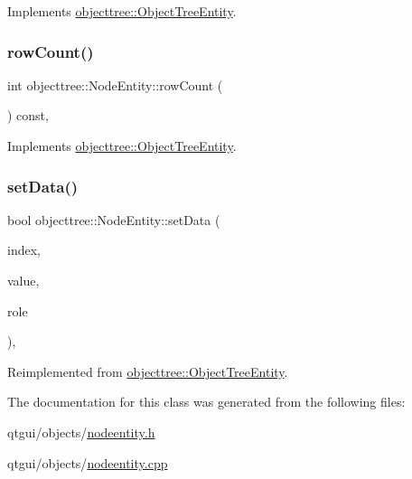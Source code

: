 Implements \mbox{\hyperlink{classobjecttree_1_1_object_tree_entity_a2d1b13c056476f87637aacd7e99e7305}{objecttree\+::\+Object\+Tree\+Entity}}.

\mbox{\label{classobjecttree_1_1_node_entity_a0cb1dcb7837edb77b42fb2d758d5c286}} 
\subsubsection{\texorpdfstring{rowCount()}{rowCount()}}
{\footnotesize\ttfamily int objecttree\+::\+Node\+Entity\+::row\+Count (\begin{DoxyParamCaption}{ }\end{DoxyParamCaption}) const\hspace{0.3cm}{\ttfamily [override]}, {\ttfamily [virtual]}}



Implements \mbox{\hyperlink{classobjecttree_1_1_object_tree_entity_a82c626bb28c55dcfce11cf7ec3368588}{objecttree\+::\+Object\+Tree\+Entity}}.

\mbox{\label{classobjecttree_1_1_node_entity_a0ea396d5931c5e5984a1d4c8188163ea}} 
\subsubsection{\texorpdfstring{setData()}{setData()}}
{\footnotesize\ttfamily bool objecttree\+::\+Node\+Entity\+::set\+Data (\begin{DoxyParamCaption}\item[{const Q\+Model\+Index \&}]{index,  }\item[{const Q\+Variant \&}]{value,  }\item[{int}]{role }\end{DoxyParamCaption})\hspace{0.3cm}{\ttfamily [override]}, {\ttfamily [virtual]}}



Reimplemented from \mbox{\hyperlink{classobjecttree_1_1_object_tree_entity_ab6742194e637093cb1571998bee88ff5}{objecttree\+::\+Object\+Tree\+Entity}}.



The documentation for this class was generated from the following files\+:\begin{DoxyCompactItemize}
\item 
qtgui/objects/\mbox{\hyperlink{nodeentity_8h}{nodeentity.\+h}}\item 
qtgui/objects/\mbox{\hyperlink{nodeentity_8cpp}{nodeentity.\+cpp}}\end{DoxyCompactItemize}

